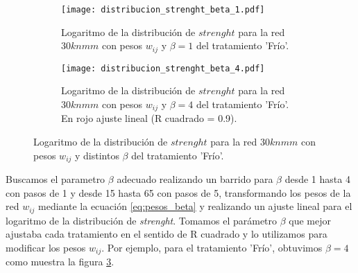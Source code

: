 \begin{figure}[t!]
    \centering
    \begin{subfigure}[t]{0.45\textwidth}
    \centering
    \texttt{[image: distribucion\_strenght\_beta\_1.pdf]}
    \caption{Logaritmo de la distribución de $strenght$ para la red $30knmm$ con pesos $w_{ij}$ y $\beta=1$ del tratamiento 'Frío'.}
    \label{fig:distribucion_strenght_beta_1}
    \end{subfigure}    
    \begin{subfigure}[t]{0.45\textwidth}
    \centering
    \texttt{[image: distribucion\_strenght\_beta\_4.pdf]}
    \caption{Logaritmo de la distribución de $strenght$ para la red $30knmm$ con pesos $w_{ij}$ y $\beta=4$ del tratamiento 'Frío'. En rojo ajuste lineal (R cuadrado = 0.9).}
    \label{fig:distribucion_strenght_beta_4}
    \end{subfigure}    
    \caption{Logaritmo de la distribución de $strenght$ para la red $30knmm$ con pesos $w_{ij}$ y distintos $\beta$ del tratamiento 'Frío'.}
\end{figure}
Buscamos el parametro $\beta$ adecuado realizando un barrido para $\beta$ desde 1 hasta 4 con pasos de 1 y desde 15 hasta 65 con pasos de 5, transformando los pesos de la red $w_{ij}$ mediante la ecuación \ref{eq:pesos_beta} y realizando un ajuste lineal para el logaritmo de la distribución de \textit{strenght}. Tomamos el parámetro $\beta$ que mejor ajustaba cada tratamiento en el sentido de R cuadrado y lo utilizamos para modificar los pesos $w_{ij}$. Por ejemplo, para el tratamiento 'Frío', obtuvimos $\beta=4$ como muestra la figura \ref{fig:distribucion_strenght_beta_4}.
